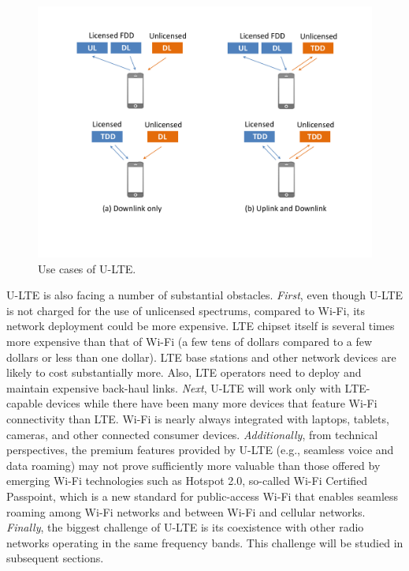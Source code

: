 \begin{figure}[!t]
	\centering
	\includegraphics[width=0.7\columnwidth]{figures2/U-LTE-use_model}
	\caption{Use cases of U-LTE.}
	\label{figs:U-LTE-use_model}
\end{figure}

U-LTE is also facing a number of substantial obstacles. \textit{First}, even though U-LTE is not charged for the use of unlicensed spectrums, compared to Wi-Fi, its network deployment could be more expensive. LTE chipset itself is several times more expensive than that of Wi-Fi (a few tens of dollars compared to a few dollars or less than one dollar). LTE base stations and other network devices are likely to cost substantially more. Also, LTE operators need to deploy and maintain expensive back-haul links. \textit{Next}, U-LTE will work only with LTE-capable devices while there have been many more devices that feature Wi-Fi connectivity than LTE. Wi-Fi is nearly always integrated with laptops, tablets, cameras, and other connected consumer devices. \textit{Additionally}, from technical perspectives, the premium features provided by U-LTE (e.g., seamless voice and data roaming) may not prove sufficiently more valuable than those offered by emerging Wi-Fi technologies such as Hotspot 2.0, so-called Wi-Fi Certified Passpoint, which is a new standard for public-access Wi-Fi that enables seamless roaming among Wi-Fi networks and between Wi-Fi and cellular networks. \textit{Finally}, the biggest challenge of U-LTE is its coexistence with other radio networks operating in the same frequency bands. This challenge will be studied in subsequent sections.

